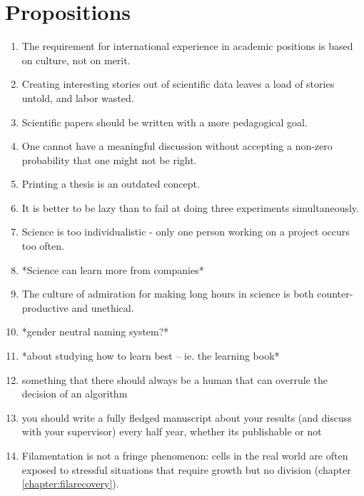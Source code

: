 



\chapter*{Propositions}

\begin{enumerate}
    \item The requirement for international experience in academic positions is based on culture, not on merit.
    \item Creating interesting stories out of scientific data leaves a load of stories untold, and labor wasted.    
    \item Scientific papers should be written with a more pedagogical goal.
    \item One cannot have a meaningful discussion without accepting a non-zero probability that one might not be right.
    \item Printing a thesis is an outdated concept.
    \item It is better to be lazy than to fail at doing three experiments simultaneously.
    \item Science is too individualistic - only one person working on a project occurs too often.
    \item *Science can learn more from companies*
    \item The culture of admiration for making long hours in science is both counter-productive and unethical.
    \item *gender neutral naming system?*
    \item *about studying how to learn best -- ie. the learning book*
    \item something that there should always be a human that can overrule the decision of an algorithm
    \item you should write a fully fledged manuscript about your results (and discuss with your supervisor) every half year, whether its publishable or not
    \item Filamentation is not a fringe phenomenon: cells in the real world are often exposed to stressful situations that require growth but no division (chapter \ref{chapter:filarecovery}).

\end{enumerate}
